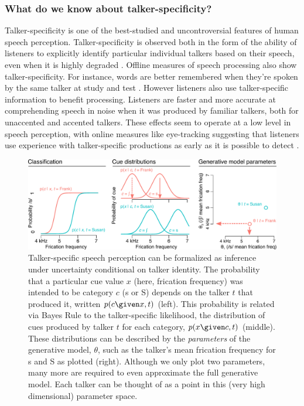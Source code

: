 \subsubsection{What do we know about talker-specificity?}
\label{sec:what-do-we-know-talker-spec}

Talker-specificity is one of the best-studied and uncontroversial features of human speech perception.  Talker-specificity is observed both in the form of the ability of listeners to explicitly identify particular individual talkers based on their speech, even when it is highly degraded \autocite{Bricker1966,Palmeri1993,Remez1997,Sheffert2002}.  Offline measures of speech processing also show talker-specificity.  For instance, words are better remembered when they're spoken by the same talker at study and test \autocite{Goldinger1996,Palmeri1993}.  However listeners also use talker-specific information to benefit processing.  Listeners are faster and more accurate at comprehending speech in noise when it was produced by familiar talkers, both for unaccented \autocite{Nygaard1998} and accented \autocite{Clarke2004} talkers.  These effects seem to operate at a low level in speech perception, with online measures like eye-tracking suggesting that listeners use experience with talker-specific productions as early as it is possible to detect \autocite{Creel2008,Mitterer2013}.

\begin{figure}[htb]
  \centering
  \includegraphics[width=\textwidth]{part2-schematics/part2-fig1-assembled.pdf}
  \caption{Talker-specific speech perception can be formalized as inference under uncertainty conditional on talker identity.  The probability that a particular cue value $x$ (here, frication frequency) was intended to be category $c$ (\ph s or \ph S) depends on the talker $t$ that produced it, written $p(c \given x, t)$ (left).  This probability is related via Bayes Rule to the talker-specific likelihood, the distribution of cues produced by talker $t$ for each category, $p(x \given c, t)$ (middle).  These distributions can be described by the \emph{parameters} of the generative model, $\theta$, such as the talker's mean frication frequency for \ph s and \ph S as plotted (right).  Although we only plot two parameters, many more are required to even approximate the full generative model.  Each talker can be thought of as a point in this (very high dimensional) parameter space.}
  \label{fig:gen-model-points}
\end{figure}

